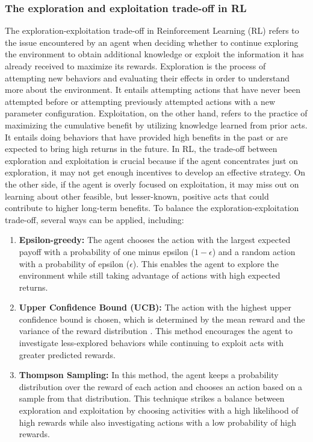 \documentclass[12pt,oneside]{article}
\begin{document}
\subsubsection{The exploration and exploitation trade-off in RL}
The exploration-exploitation trade-off in Reinforcement Learning (RL) refers to the issue encountered by an agent when deciding whether to continue exploring the environment to obtain additional knowledge or exploit the information it has already received to maximize its rewards.
Exploration is the process of attempting new behaviors and evaluating their effects in order to understand more about the environment. It entails attempting actions that have never been attempted before or attempting previously attempted actions with a new parameter configuration. Exploitation, on the other hand, refers to the practice of maximizing the cumulative benefit by utilizing knowledge learned from prior acts. It entails doing behaviors that have provided high benefits in the past or are expected to bring high returns in the future.
In RL, the trade-off between exploration and exploitation is crucial because if the agent concentrates just on exploration, it may not get enough incentives to develop an effective strategy. On the other side, if the agent is overly focused on exploitation, it may miss out on learning about other feasible, but lesser-known, positive acts that could contribute to higher long-term benefits.
To balance the exploration-exploitation trade-off, several ways can be applied, including:
\begin{enumerate}
\item\label{epsilon-greedy} \textbf{Epsilon-greedy:} The agent chooses the action with the largest expected payoff with a probability of one minus epsilon ($1 - \epsilon$) and a random action with a probability of epsilon ($\epsilon$). This enables the agent to explore the environment while still taking advantage of actions with high expected returns.
\item \textbf{Upper Confidence Bound (UCB):} The action with the highest upper confidence bound is chosen, which is determined by the mean reward and the variance of the reward distribution \cite{50_kaufmann2012bayesian}. This method encourages the agent to investigate less-explored behaviors while continuing to exploit acts with greater predicted rewards.
\item \textbf{Thompson Sampling:} In this method, the agent keeps a probability distribution over the reward of each action and chooses an action based on a sample from that distribution. This technique strikes a balance between exploration and exploitation by choosing activities with a high likelihood of high rewards while also investigating actions with a low probability of high rewards.
\end{enumerate}
\end{document}
